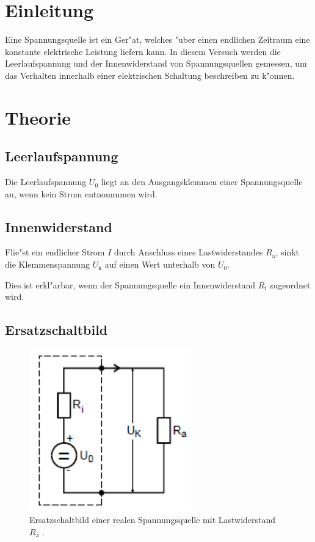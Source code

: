 \section{Einleitung} %
\label{sec:einleitung}

Eine Spannungsquelle ist ein Ger"at, welches "uber einen endlichen Zeitraum eine konstante elektrische Leistung liefern kann.
In diesem Versuch werden die Leerlaufspannung und der Innenwiderstand von Spannungsquellen gemessen, um das Verhalten innerhalb einer elektrischen Schaltung beschreiben zu k"onnen.

\section{Theorie} %
\label{sec:theorie}


\subsection{Leerlaufspannung} %
\label{sub:leerlaufspannung}

Die Leerlaufspannung $U_\mathrm{0}$ liegt an den Ausgangsklemmen einer Spannungsquelle an, wenn kein Strom entnommmen wird.

\subsection{Innenwiderstand} %
\label{sub:klemmenspannung}

Flie"st ein endlicher Strom $I$ durch Anschluss eines Lastwiderstandes $R_\mathrm{a}$, sinkt die Klemmenspannung $U_\mathrm{k}$ auf einen Wert unterhalb von $U_\mathrm{0}$.

Dies ist erkl"arbar, wenn der Spannungsquelle ein Innenwiderstand $R_\mathrm{i}$ zugeordnet wird.

\subsection{Ersatzschaltbild} %
\label{sub:ersatzschaltbild}

\begin{figure}
	\centering
	\includegraphics[width = 7cm]{img/Monozelle.PNG}
	\caption{Ersatzschaltbild einer realen Spannungsquelle mit Lastwiderstand $R_\mathrm{a}$ \cite{anleitung}.}
	\label{monozelle}
\end{figure}

